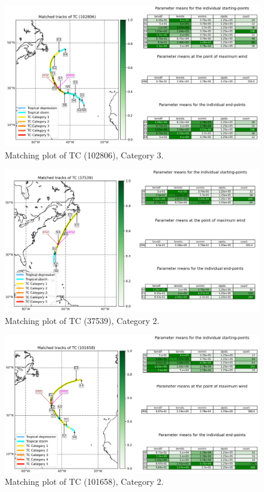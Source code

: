 \begin{figure}[ht]
	\centering
	\includegraphics[width=\textwidth]{img/B_matching_plot_reasonable_amw_ref_01_tc102806_param_id149_cat3.png}
	\caption{Matching plot of TC (102806), Category 3.}
\end{figure}
\begin{figure}[ht]
	\centering
	\includegraphics[width=\textwidth]{img/B_matching_plot_reasonable_amw_rm_10_tc37539_param_id149_cat2.png}
	\caption{Matching plot of TC (37539), Category 2.}
\end{figure}
\begin{figure}[ht]
	\centering
	\includegraphics[width=\textwidth]{img/B_matching_plot_reasonable_amw_ref_03_tc101658_param_id149_cat2.png}
	\caption{Matching plot of TC (101658), Category 2.}
\end{figure}

